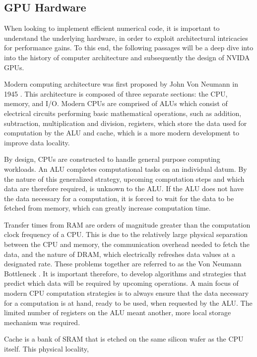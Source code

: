 \subsection{GPU Hardware}
When looking to implement efficient numerical code, it is important to understand
 the underlying hardware, in order to exploit architectural intricacies for performance gains.
 To this end, the following passages will be a deep dive into into the history of
 computer architecture and subsequently the design of NVIDA \glspl{GPU}.
\par
Modern computing architecture was first proposed by John Von Neumann in 1945 \cite{vonNeumann}.
This architecture is composed of three separate sections: the \gls{CPU}, memory, and \gls{I/O}.
Modern \glspl{CPU} are comprised of \glspl{ALU} which consist of electrical circuits
performing basic mathematical operations, such as addition, subtraction, multiplication and division,
registers, which store the data used for computation by the ALU and cache, which is a more modern development to improve data locality.
\par
By design, \glspl{CPU} are constructed
to handle general purpose computing workloads.
An \gls{ALU} completes computational
tasks on an individual datum. By the nature of this
generalized strategy, upcoming computation steps and which data are therefore required,
is unknown to the \gls{ALU}. If the ALU does not have the data necessary for a computation,
it is forced to wait for the data to be fetched from memory, which can greatly increase computation time.
\par
Transfer times from \gls{RAM}
are orders of magnitude greater than the computation clock frequency of
a CPU.  This is due to the relatively large physical separation between the CPU and memory,
 the communication overhead needed to fetch the data, and
the nature of \gls{DRAM}, which electrically refreshes data values at a designated rate.
These problems together are referred to as the Von Neumann Bottleneck \cite{Backus}.
It is important therefore, to develop algorithms and strategies that  predict which data will be required by upcoming operations.
A main focus of modern CPU computation strategies is to always ensure that the data
necessary for a computation is at hand, ready to be used, when requested by the \gls{ALU}.
The limited number of registers on the ALU meant another, more local storage mechanism
was required.
\par
Cache is a bank of \gls{SRAM}
that is etched on the same silicon wafer as the CPU itself.  This physical locality,
